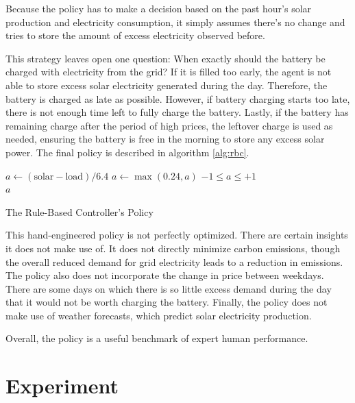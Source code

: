 Because the policy has to make a decision based on the past hour's solar production and electricity consumption, it simply assumes there's no change and tries to store the amount of excess electricity observed before.

This strategy leaves open one question:
When exactly should the battery be charged with electricity from the grid?
If it is filled too early, the agent is not able to store excess solar electricity generated during the day.
Therefore, the battery is charged as late as possible.
However, if battery charging starts too late, there is not enough time left to fully charge the battery. 
Lastly, if the battery has remaining charge after the period of high prices, the leftover charge is used as needed, ensuring the battery is free in the morning to store any excess solar power.
The final policy is described in algorithm \ref{alg:rbc}.

\begin{algorithm}[h]
    \begin{algorithmic}
        \State $a \gets (\text{solar} - \text{load})/6.4$ 
            \State $a \gets \max(0.24, a)$ 
        \EndIf
        \Ensure $-1 \leq a \leq +1$ \\
        \Return $a$
    \end{algorithmic}
    \caption{The Rule-Based Controller's Policy}
    \label{alg:rbc}
\end{algorithm}

This hand-engineered policy is not perfectly optimized.
There are certain insights it does not make use of.
It does not directly minimize carbon emissions, though the overall reduced demand for grid electricity leads to a reduction in emissions.
The policy also does not incorporate the change in price between weekdays.
There are some days on which there is so little excess demand during the day that it would not be worth charging the battery.
Finally, the policy does not make use of weather forecasts, which predict solar electricity production.

Overall, the policy is a useful benchmark of expert human performance.

\section{Experiment} %

